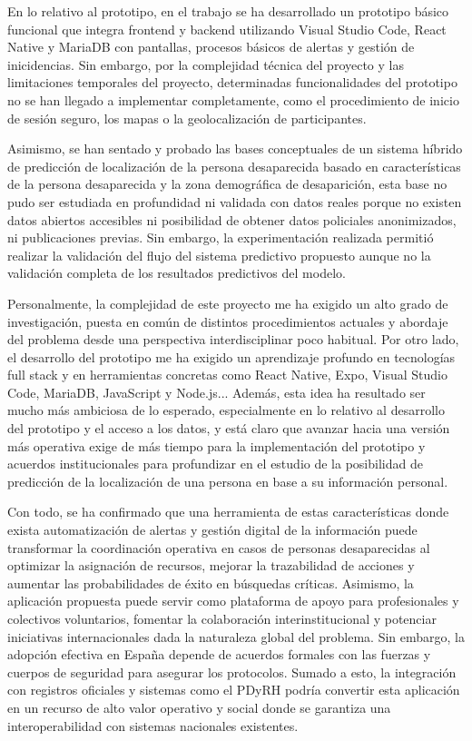 En lo relativo al prototipo, en el trabajo se ha desarrollado un prototipo básico funcional que integra frontend y backend utilizando Visual Studio Code, React Native y MariaDB con pantallas, procesos básicos de alertas y gestión de inicidencias. Sin embargo, por la complejidad técnica del proyecto y las limitaciones temporales del proyecto, determinadas funcionalidades del prototipo no se han llegado a implementar completamente, como el procedimiento de inicio de sesión seguro, los mapas o la geolocalización de participantes. 

Asimismo, se han sentado y probado las bases conceptuales de un sistema híbrido de predicción de localización de la persona desaparecida basado en características de la persona desaparecida y la zona demográfica de desaparición, esta base no pudo ser estudiada en profundidad ni validada con datos reales porque no existen datos abiertos accesibles ni posibilidad de obtener datos policiales anonimizados, ni publicaciones previas. Sin embargo, la experimentación realizada permitió realizar la validación del flujo del sistema predictivo propuesto aunque no la validación completa de los resultados predictivos del modelo.

Personalmente, la complejidad de este proyecto me ha exigido un alto grado de investigación, puesta en común de distintos procedimientos actuales y abordaje del problema desde una perspectiva interdisciplinar poco habitual. Por otro lado, el desarrollo del prototipo me ha exigido un aprendizaje profundo en tecnologías full stack y en herramientas concretas como React Native, Expo, Visual Studio Code, MariaDB, JavaScript y Node.js... Además, esta idea ha resultado ser mucho más ambiciosa de lo esperado, especialmente en lo relativo al desarrollo del prototipo y el acceso a los datos, y está claro que avanzar hacia una versión más operativa exige de más tiempo para la implementación del prototipo y acuerdos institucionales para profundizar en el estudio de la posibilidad de predicción de la localización de una persona en base a su información personal.


Con todo, se ha confirmado que una herramienta de estas características donde exista automatización de alertas y gestión digital de la información puede transformar la coordinación operativa en casos de personas desaparecidas al optimizar la asignación de recursos, mejorar la trazabilidad de acciones y aumentar las probabilidades de éxito en búsquedas críticas. Asimismo, la aplicación propuesta puede servir como plataforma de apoyo para profesionales y colectivos voluntarios, fomentar la colaboración interinstitucional y potenciar iniciativas internacionales dada la naturaleza global del problema. Sin embargo, la adopción efectiva en España depende de acuerdos formales con las fuerzas y cuerpos de seguridad para asegurar los protocolos. Sumado a esto, la integración con registros oficiales y sistemas como el PDyRH podría convertir esta aplicación en un recurso de alto valor operativo y social donde se garantiza una interoperabilidad con sistemas nacionales existentes.
